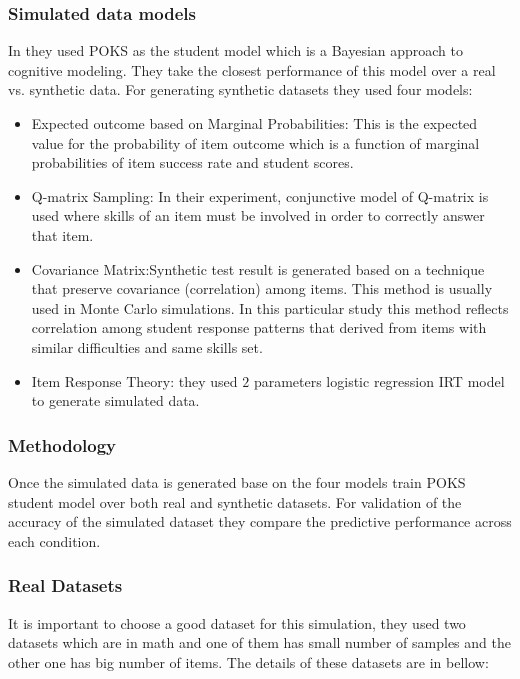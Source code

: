 \subsubsection{Simulated data models}

In \citep{Desmarais2010} they used POKS as the student model which is a Bayesian approach to cognitive modeling. They take the closest performance of this model over a real vs. synthetic data. For generating synthetic datasets they used four models:

\begin{itemize}
\item Expected outcome based on Marginal Probabilities: This is the expected value for the probability of item outcome which is a function of marginal probabilities of item success rate and student scores.
\item Q-matrix Sampling: In their experiment, conjunctive model of Q-matrix is used where skills of an item must be involved in order to correctly answer that item.
\item Covariance Matrix:Synthetic test result is generated based on a technique that preserve covariance (correlation) among items. This method is usually used in Monte Carlo simulations. In this particular study this method reflects correlation among student response patterns that derived from items with similar difficulties and same skills set.
\item Item Response Theory: they used $2$ parameters logistic regression IRT model to generate simulated data.

\end{itemize}

\subsubsection{Methodology}
Once the simulated data is generated base on the four models \citet{Desmarais2010} train POKS student model over both real and synthetic datasets. For validation of the accuracy of the simulated dataset they compare the predictive performance across each condition. 

\subsubsection{Real Datasets}
It is important to choose a good dataset for this simulation, they used two datasets which are in math and one of them has small number of samples and the other one has big number of items. The details of these datasets are in bellow:

